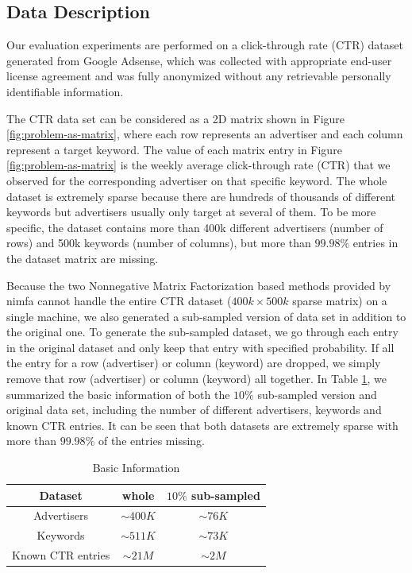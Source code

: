 \subsection{Data Description}
\label{sec:data_desc}
Our evaluation experiments are performed on a click-through rate (CTR)
dataset generated from Google Adsense, which was collected with
appropriate end-user license agreement and was fully anonymized
without any retrievable personally identifiable information.

The CTR data set can be considered as a 2D matrix shown in Figure
\ref{fig:problem-as-matrix}, where each row represents an advertiser
and each column represent a target keyword. The value of each matrix
entry in Figure \ref{fig:problem-as-matrix} is the weekly average
click-through rate (CTR) that we observed for the corresponding
advertiser on that specific keyword. The whole dataset is extremely
sparse because there are hundreds of thousands of different keywords
but advertisers usually only target at several of them. To be more
specific, the dataset contains more than 400k different advertisers
(number of rows) and 500k keywords (number of columns), but more than
$99.98\%$ entries in the dataset matrix are missing.

Because the two Nonnegative Matrix Factorization based methods
provided by nimfa cannot handle the entire CTR dataset ($400k \times
500k$ sparse matrix) on a single machine, we also generated a
sub-sampled version of data set in addition to the original one. To
generate the sub-sampled dataset, we go through each entry in the
original dataset and only keep that entry with specified
probability. If all the entry for a row (advertiser) or column
(keyword) are dropped, we simply remove that row (advertiser) or
column (keyword) all together. In Table \ref{tab:data}, we summarized
the basic information of both the $10\%$ sub-sampled version and
original data set, including the number of different advertisers,
keywords and known CTR entries. It can be seen that both datasets are
extremely sparse with more than $99.98\%$ of the entries missing.


\begin{table}[!ht]
\centering
\begin{tabular}{|c|c|c|}
  \hline	\hline
  Dataset & whole & $10\%$ sub-sampled\\ \hline
  Advertisers & $\sim 400K$ & $\sim 76K$  \\ 
  Keywords & $\sim 511K$ & $\sim 73K$  \\ 
  Known CTR entries &  $\sim 21M$ & $\sim 2M$ \\ \hline
\end{tabular}
\caption{Basic Information}
\label{tab:data}
\end{table}

